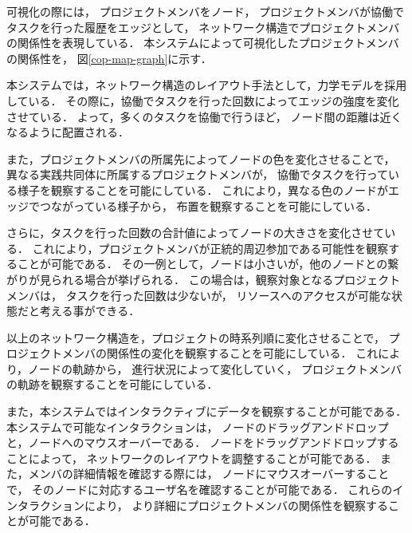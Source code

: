 \documentclass[submit,techrep]{ipsj}
\begin{document}
可視化の際には，
プロジェクトメンバをノード，
プロジェクトメンバが協働でタスクを行った履歴をエッジとして，
ネットワーク構造でプロジェクトメンバの関係性を表現している．
本システムによって可視化したプロジェクトメンバの関係性を，
図\ref{cop-map-graph}に示す．

本システムでは，ネットワーク構造のレイアウト手法として，力学モデルを採用している．
その際に，協働でタスクを行った回数によってエッジの強度を変化させている．
よって，多くのタスクを協働で行うほど，
ノード間の距離は近くなるように配置される．

また，プロジェクトメンバの所属先によってノードの色を変化させることで，
異なる実践共同体に所属するプロジェクトメンバが，
協働でタスクを行っている様子を観察することを可能にしている．
これにより，異なる色のノードがエッジでつながっている様子から，
布置を観察することを可能にしている．

さらに，タスクを行った回数の合計値によってノードの大きさを変化させている．
これにより，プロジェクトメンバが正統的周辺参加である可能性を観察することが可能である．
その一例として，ノードは小さいが，他のノードとの繋がりが見られる場合が挙げられる．
この場合は，観察対象となるプロジェクトメンバは，
タスクを行った回数は少ないが，
リソースへのアクセスが可能な状態だと考える事ができる．

以上のネットワーク構造を，プロジェクトの時系列順に変化させることで，
プロジェクトメンバの関係性の変化を観察することを可能にしている．
これにより，ノードの軌跡から，
進行状況によって変化していく，
プロジェクトメンバの軌跡を観察することを可能にしている．

また，本システムではインタラクティブにデータを観察することが可能である．
本システムで可能なインタラクションは，
ノードのドラッグアンドドロップと，ノードへのマウスオーバーである．
ノードをドラッグアンドドロップすることによって，
ネットワークのレイアウトを調整することが可能である．
また，メンバの詳細情報を確認する際には，
ノードにマウスオーバーすることで，
そのノードに対応するユーザ名を確認することが可能である．
これらのインタラクションにより，
より詳細にプロジェクトメンバの関係性を観察することが可能である．

\end{document}
